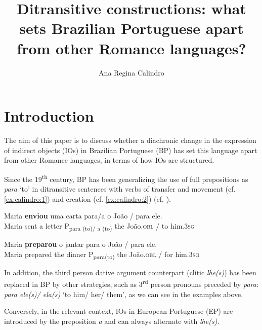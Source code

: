\documentclass[output=paper,colorlinks,citecolor=brown,nonflat]{./langscibook}
\author{Ana Regina Calindro\affiliation{Federal University of Rio de Janeiro (UFRJ)}}
\title{Ditransitive constructions: what sets Brazilian Portuguese apart from other Romance languages?}
\begin{document}
\maketitle 
{}

\section{Introduction}\label{sec:calindro:1}

The aim of this paper is to discuss whether a diachronic change in the expression of indirect objects (IOs) in Brazilian Portuguese (BP) has set this language apart from other Romance languages, in terms of how IOs are structured.

Since the 19\textsuperscript{th} century, BP has been generalizing the use of full prepositions as \textit{para} ‘to’ in ditransitive sentences with verbs of transfer and movement (cf. \ref{ex:calindro:1}) and creation (cf. \ref{ex:calindro:2}) (cf. \citealt{Freire2005, TorresMoraisBerlinck2006, TorresMoraisSalles2010}).

\ea%
    \label{ex:calindro:1}
    \gll Maria \textbf{enviou}  uma carta  {para/a}   {o} {João}  / {para} {ele}. \\
     Maria sent       a letter      P{\textsubscript{para (to)/ a (to)}}   the João.\textsc{obl}  / to him.\textsc{3sg}  \\
    \z

\ea%
    \label{ex:calindro:2}
    \gll Maria     \textbf{preparou}  o jantar        {para}    {o} {João}  / {para} {ele}.\\
    Maria     prepared  the dinner    P\textsubscript{para(to)} the João.\textsc{obl} / for him.\textsc{3sg} \\
    \z

In addition, the third person dative argument counterpart (clitic \textit{lhe(s)}) has been replaced in BP by other strategies, such as 3\textsuperscript{rd} person pronouns preceded by \textit{para}:  \textit{para ele(s)/ ela(s)} ‘to him/ her/ them’, as we can see in the examples above.

Conversely, in the relevant context, IOs in European Portuguese (EP) are introduced by the preposition \textit{a} and can always alternate with \textit{lhe(s)}.
\end{document}
